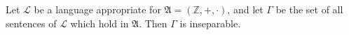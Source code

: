 Let $\mathcal{L}$ be a language appropriate for $\mathfrak{A} = (\mathbb{Z}, +, \cdot)$, and let $\Gamma$ be the set of all sentences of $\mathcal{L}$ which hold in $\mathfrak{A}$. Then $\Gamma$ is inseparable.

